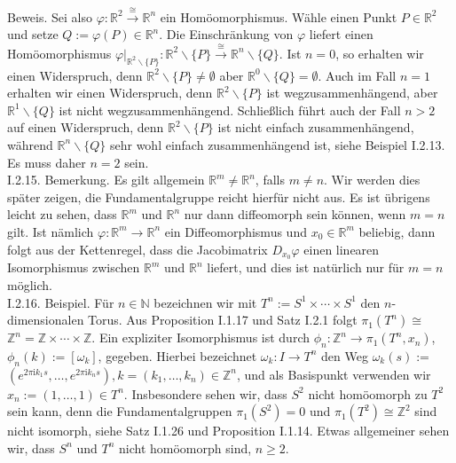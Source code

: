 \documentclass[10pt]{article}
\begin{document}
Beweis. Sei also $\varphi: \mathbb{R}^{2} \xrightarrow{\cong} \mathbb{R}^{n}$ ein Homöomorphismus. Wähle einen Punkt $P \in \mathbb{R}^{2}$ und setze $Q:=\varphi(P) \in \mathbb{R}^{n}$. Die Einschränkung von $\varphi$ liefert einen Homöomorphismus $\left.\varphi\right|_{\mathbb{R}^{2} \backslash\{P\}}: \mathbb{R}^{2} \backslash\{P\} \xrightarrow{\cong} \mathbb{R}^{n} \backslash\{Q\}$. Ist $n=0$, so erhalten wir einen Widerspruch, denn $\mathbb{R}^{2} \backslash\{P\} \neq \emptyset$ aber $\mathbb{R}^{0} \backslash\{Q\}=\emptyset$. Auch im Fall $n=1$ erhalten wir einen Widerspruch, denn $\mathbb{R}^{2} \backslash\{P\}$ ist wegzusammenhängend, aber $\mathbb{R}^{1} \backslash\{Q\}$ ist nicht wegzusammenhängend. Schließlich führt auch der Fall $n>2$ auf einen Widerspruch, denn $\mathbb{R}^{2} \backslash\{P\}$ ist nicht einfach zusammenhängend, während $\mathbb{R}^{n} \backslash\{Q\}$ sehr wohl einfach zusammenhängend ist, siehe Beispiel I.2.13. Es muss daher $n=2$ sein.\\
I.2.15. Bemerkung. Es gilt allgemein $\mathbb{R}^{m} \neq \mathbb{R}^{n}$, falls $m \neq n$. Wir werden dies später zeigen, die Fundamentalgruppe reicht hierfür nicht aus. Es ist übrigens leicht zu sehen, dass $\mathbb{R}^{m}$ und $\mathbb{R}^{n}$ nur dann diffeomorph sein können, wenn $m=n$ gilt. Ist nämlich $\varphi: \mathbb{R}^{m} \rightarrow \mathbb{R}^{n}$ ein Diffeomorphismus und $x_{0} \in \mathbb{R}^{m}$ beliebig, dann folgt aus der Kettenregel, dass die Jacobimatrix $D_{x_{0}} \varphi$ einen linearen Isomorphismus zwischen $\mathbb{R}^{m}$ und $\mathbb{R}^{n}$ liefert, und dies ist natürlich nur für $m=n$ möglich.\\
I.2.16. Beispiel. Für $n \in \mathbb{N}$ bezeichnen wir mit $T^{n}:=S^{1} \times \cdots \times S^{1}$ den $n$-dimensionalen Torus. Aus Proposition I.1.17 und Satz I.2.1 folgt $\pi_{1}\left(T^{n}\right) \cong$ $\mathbb{Z}^{n}=\mathbb{Z} \times \cdots \times \mathbb{Z}$. Ein expliziter Isomorphismus ist durch $\phi_{n}: \mathbb{Z}^{n} \rightarrow \pi_{1}\left(T^{n}, x_{n}\right)$, $\phi_{n}(k):=\left[\omega_{k}\right]$, gegeben. Hierbei bezeichnet $\omega_{k}: I \rightarrow T^{n}$ den Weg $\omega_{k}(s):=$ $\left(e^{2 \pi \mathrm{i} k_{1} s}, \ldots, e^{2 \pi \mathrm{i} k_{n} s}\right), k=\left(k_{1}, \ldots, k_{n}\right) \in \mathbb{Z}^{n}$, und als Basispunkt verwenden wir $x_{n}:=(1, \ldots, 1) \in T^{n}$. Insbesondere sehen wir, dass $S^{2}$ nicht homöomorph zu $T^{2}$ sein kann, denn die Fundamentalgruppen $\pi_{1}\left(S^{2}\right)=0$ und $\pi_{1}\left(T^{2}\right) \cong \mathbb{Z}^{2}$ sind nicht isomorph, siehe Satz I.1.26 und Proposition I.1.14. Etwas allgemeiner sehen wir, dass $S^{n}$ und $T^{n}$ nicht homöomorph sind, $n \geq 2$.\\
\end{document}
